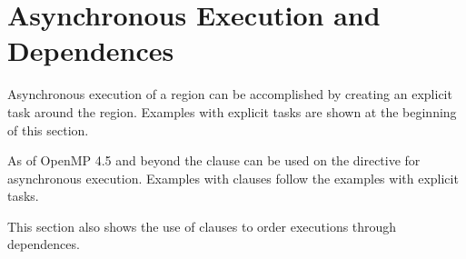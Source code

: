 \pagebreak
\section{Asynchronous  Execution and Dependences}
\label{sec:async_target_exec_depend}

Asynchronous execution of a  region can be accomplished
by creating an explicit task around the  region. Examples
with explicit tasks are shown at the beginning of this section. 

As of OpenMP 4.5 and beyond the  clause can be used on the
 directive for asynchronous execution. Examples with 
 clauses follow the examples with explicit tasks.

This section also shows the use of  clauses to order 
executions through dependences.
